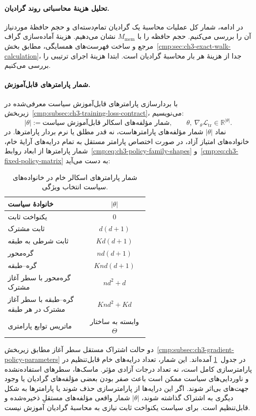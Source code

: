 \paragraph{تحلیل هزینهٔ محاسباتی روند گرادیان.}
در ادامه، شمار کل عملیات محاسبهٔ یک گرادیان
تمام‌دسته‌ای و حجم حافظهٔ موردنیاز آن را بررسی
می‌کنیم. حجم حافظه را با $M_{\mathrm{mem}}$ نشان می‌دهیم.
هزینهٔ آماده‌سازی گراف مرجع و ساخت فهرست‌های
همسایگی، مطابق بخش~\ref{cmp:sec:ch3-exact-walk-calculation}،
جدا از هزینهٔ هر بار محاسبهٔ گرادیان است.
ابتدا هزینهٔ اجرای ترتیبی را بررسی می‌کنیم.

\paragraph{شمار پارامترهای قابل‌آموزش.}
با بردارسازی پارامترهای قابل‌آموزش سیاست
معرفی‌شده در زیربخش~\ref{cmp:subsec:ch3-training-loss-contract}،
می‌نویسیم:
\begin{equation}\label{cmp:eq:ch3-trainable-parameter-count}
|\theta|:=\text{شمار مؤلفه‌های اسکالر قابل‌آموزش سیاست},
\qquad
\theta,\ \nabla_\theta\mathcal L_{\mathrm{tr}}
\in\mathbb R^{|\theta|}.
\end{equation}
نماد $|\theta|$ شمار مؤلفه‌های پارامترهاست،
نه قدر مطلق یا نرم بردار پارامترها.
در خانواده‌های امتیاز آزاد، در صورت اختصاص
پارامتر مستقل به تمام درایه‌های آرایهٔ خام،
شمار پارامترها از ابعاد
روابط~\eqref{cmp:eq:ch3-policy-family-shapes}
و~\eqref{cmp:eq:ch3-fixed-policy-matrix}
به دست می‌آید:
\begin{table}[!htbp]
\centering
\caption{شمار پارامترهای اسکالر خام در خانواده‌های سیاست انتخاب ویژگی.}
\label{cmp:tab:ch3-trainable-parameter-count}
\begin{tabular}{p{0.57\linewidth}c}
\hline
خانوادهٔ سیاست & $|\theta|$\\
\hline
یکنواخت ثابت & $0$\\
ثابت مشترک & $d(d+1)$\\
ثابت شرطی به طبقه & $Kd(d+1)$\\
گره‌محور & $nd(d+1)$\\
گره--طبقه & $Knd(d+1)$\\
گره‌محور با سطر آغاز مشترک & $nd^2+d$\\
گره--طبقه با سطر آغاز مشترک در هر طبقه & $Knd^2+Kd$\\
ماتریس توابع پارامتری & وابسته به ساختار $\Theta$\\
\hline
\end{tabular}
\end{table}
دو حالت اشتراک مستقل سطر آغاز مطابق
زیربخش~\ref{cmp:subsec:ch3-gradient-policy-parameters}
در جدول~\ref{cmp:tab:ch3-trainable-parameter-count}
آمده‌اند. این شمار، تعداد درایه‌های خام
قابل‌تنظیم در پارامترسازی کامل است، نه
تعداد درجات آزادی مؤثر. ماسک‌ها، سطرهای
استفاده‌نشده و ناوردایی‌های سیاست ممکن است
باعث صفر بودن بعضی مؤلفه‌های گرادیان یا
وجود جهت‌های بی‌اثر شوند. اگر این درایه‌ها
از پارامترسازی حذف شوند یا پارامترها به
شکل دیگری به اشتراک گذاشته شوند، $|\theta|$ شمار
واقعی مؤلفه‌های مستقلِ ذخیره‌شده و قابل‌تنظیم
است. برای سیاست یکنواخت ثابت نیازی به
محاسبهٔ گرادیان آموزش نیست.

